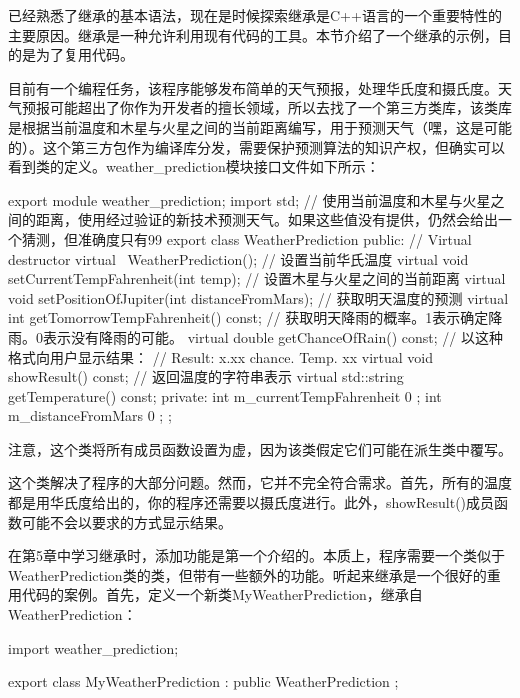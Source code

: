 
已经熟悉了继承的基本语法，现在是时候探索继承是C++语言的一个重要特性的主要原因。继承是一种允许利用现有代码的工具。本节介绍了一个继承的示例，目的是为了复用代码。


目前有一个编程任务，该程序能够发布简单的天气预报，处理华氏度和摄氏度。天气预报可能超出了你作为开发者的擅长领域，所以去找了一个第三方类库，该类库是根据当前温度和木星与火星之间的当前距离编写，用于预测天气（嘿，这是可能的）。这个第三方包作为编译库分发，需要保护预测算法的知识产权，但确实可以看到类的定义。weather\_prediction模块接口文件如下所示：

\begin{cpp}
export module weather_prediction;
import std;
// 使用当前温度和木星与火星之间的距离，使用经过验证的新技术预测天气。如果这些值没有提供，仍然会给出一个猜测，但准确度只有99%
export class WeatherPrediction
{
    public:
        // Virtual destructor
        virtual ~WeatherPrediction();
        // 设置当前华氏温度
        virtual void setCurrentTempFahrenheit(int temp);
        // 设置木星与火星之间的当前距离
        virtual void setPositionOfJupiter(int distanceFromMars);
        // 获取明天温度的预测
        virtual int getTomorrowTempFahrenheit() const;
        // 获取明天降雨的概率。1表示确定降雨。0表示没有降雨的可能。
        virtual double getChanceOfRain() const;
        // 以这种格式向用户显示结果：
        // Result: x.xx chance. Temp. xx
        virtual void showResult() const;
        // 返回温度的字符串表示
        virtual std::string getTemperature() const;
    private:
        int m_currentTempFahrenheit { 0 };
        int m_distanceFromMars { 0 };
};
\end{cpp}

注意，这个类将所有成员函数设置为虚，因为该类假定它们可能在派生类中覆写。

这个类解决了程序的大部分问题。然而，它并不完全符合需求。首先，所有的温度都是用华氏度给出的，你的程序还需要以摄氏度进行。此外，showResult()成员函数可能不会以要求的方式显示结果。


在第5章中学习继承时，添加功能是第一个介绍的。本质上，程序需要一个类似于WeatherPrediction类的类，但带有一些额外的功能。听起来继承是一个很好的重用代码的案例。首先，定义一个新类MyWeatherPrediction，继承自WeatherPrediction：

\begin{cpp}
import weather_prediction;

export class MyWeatherPrediction : public WeatherPrediction
{
};
\end{cpp}

